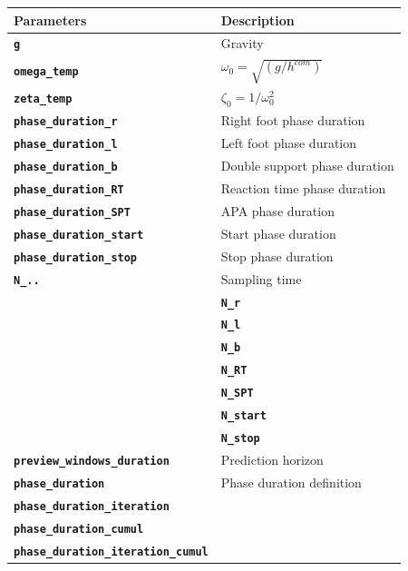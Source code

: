 \documentclass[12pt,oneside,notitlepage,abstracton,a4paper]{scrartcl}
\begin{document}
\begin{table}[!htbp] 
\begin{center}
\begin{tabular}{|l|l|}
  \hline
  \rowcolor{green!25}\bf {\small Parameters}      & \bf {\small Description}  \\ \hline 
  \textbf{\texttt{g}}          & Gravity \\ \hline 
  \textbf{\texttt{omega\_temp}} &  \textbf{\texttt{$\omega_0=\sqrt{(g/h^{com})}$}} \\ \hline
  \textbf{\texttt{zeta\_temp}} &  $\zeta_0=1/\omega_0^2$\\ \hline  
  \textbf{\texttt{phase\_duration\_r}}          & Right foot phase duration\\ \hline
  \textbf{\texttt{phase\_duration\_l}}          & Left foot phase duration\\ \hline
  \textbf{\texttt{phase\_duration\_b}}          & Double support phase duration\\ \hline
  \textbf{\texttt{phase\_duration\_RT}}          & Reaction time phase duration  \\ \hline
  \textbf{\texttt{phase\_duration\_SPT}}          & APA phase duration \\ \hline
  \textbf{\texttt{phase\_duration\_start}}          & Start  phase duration\\ \hline
  \textbf{\texttt{phase\_duration\_stop}}          &  Stop phase duration\\ \hline
  \textbf{\texttt{N\_..}}          & Sampling time\\  
  &\textbf{\texttt{N\_r}} \\  
  &\textbf{\texttt{N\_l}} \\  
  &\textbf{\texttt{N\_b}} \\ 
  &\textbf{\texttt{N\_RT}} \\ 
  &\textbf{\texttt{N\_SPT}} \\  
  &\textbf{\texttt{N\_start}} \\ 
  &\textbf{\texttt{N\_stop}} \\ \hline
  \textbf{\texttt{preview\_windows\_duration}} & Prediction horizon \\ \hline 
 \textbf{\texttt{phase\_duration}}         &Phase duration definition \\ \hline
 \textbf{\texttt{phase\_duration\_iteration}}         & \\ \hline
 \textbf{\texttt{phase\_duration\_cumul}}         & \\ \hline
 \textbf{\texttt{phase\_duration\_iteration\_cumul}}         & \\ \hline

\end{tabular}
\end{center}
\end{table}
\end{document}
